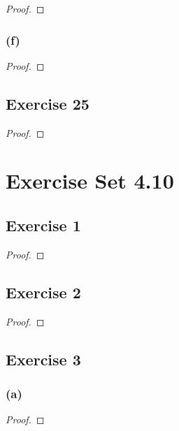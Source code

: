 \documentclass[14pt]{extarticle}
\begin{document}
\begin{proof}

\end{proof}

\subsubsection{(f)}

\begin{proof}

\end{proof}

\subsection{Exercise 25}

\begin{proof}

\end{proof}

\section{Exercise Set 4.10}

\subsection{Exercise 1}

\begin{proof}

\end{proof}

\subsection{Exercise 2}

\begin{proof}

\end{proof}

\subsection{Exercise 3}

\subsubsection{(a)}

\begin{proof}

\end{proof}
\end{document}
